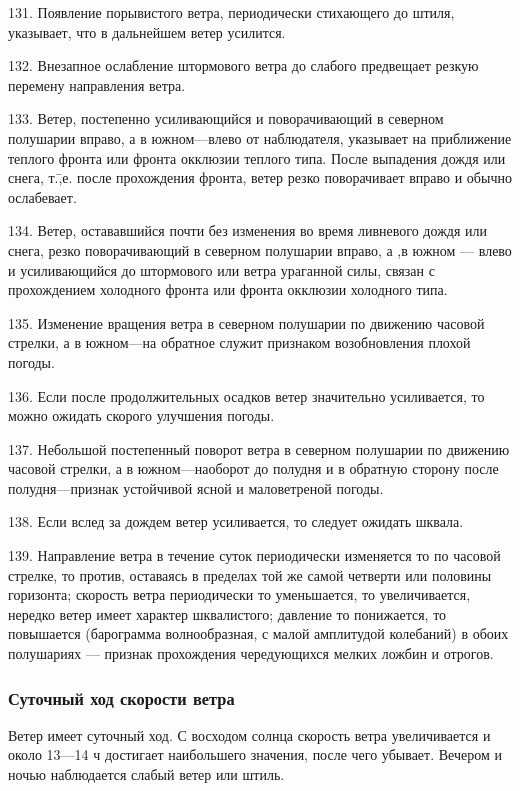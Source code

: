 131. Появление порывистого ветра, периодически стихающего до штиля, указывает, что в дальнейшем ветер усилится.

132. Внезапное ослабление штормового ветра до слабого предвещает резкую перемену направления ветра.

133. Ветер, постепенно усиливающийся и поворачивающий в северном полушарии вправо, а в южном—влево от наблюдателя, указывает на приближение теплого фронта или фронта окклюзии теплого типа. После выпадения дождя или снега, т.\=,е. после прохождения фронта, ветер резко поворачивает вправо и обычно ослабевает.

134. Ветер, остававшийся почти без изменения во время ливневого дождя или снега, резко поворачивающий в северном полушарии вправо, а ,в южном — влево и усиливающийся до штормового или ветра ураганной силы, связан с прохождением холодного фронта или фронта окклюзии холодного типа.

135. Изменение вращения ветра в северном полушарии по движению часовой стрелки, а в южном—на обратное служит признаком возобновления плохой погоды.

136. Если после продолжительных осадков ветер значительно усиливается, то можно ожидать скорого улучшения погоды.

137. Небольшой постепенный поворот ветра в северном полушарии по движению часовой стрелки, а в южном—наоборот до полудня и в обратную сторону после полудня—признак устойчивой ясной и маловетреной погоды.

138. Если вслед за дождем ветер усиливается, то следует ожидать шквала.

139. Направление ветра в течение суток периодически изменяется то по часовой стрелке, то против, оставаясь в пределах той же самой четверти или половины горизонта; скорость ветра периодически то уменьшается, то увеличивается, нередко ветер имеет характер шквалистого; давление то понижается, то повышается (барограмма волнообразная, с малой амплитудой колебаний) в обоих полушариях — признак прохождения чередующихся мелких ложбин и отрогов.

\subsubsection{Суточный ход скорости ветра}

Ветер имеет суточный ход. С восходом солнца скорость ветра увеличивается и около 13—14 ч достигает наибольшего значения, после чего убывает. Вечером и ночью наблюдается слабый ветер или штиль.

